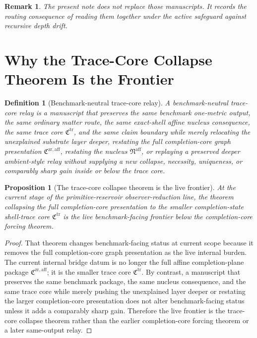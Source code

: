 \documentclass[11pt]{article}
\newcommand{\CompletionCore}{\mathfrak C^{\mathrm{zr,aff}}}
\newcommand{\TraceCore}{\mathfrak C^{\mathrm{tr}}}
\newcommand{\AffineNucleus}{\mathfrak N^{\mathrm{aff}}}
\newtheorem{definition}{Definition}
\newtheorem{proposition}{Proposition}
\newtheorem{remark}{Remark}
\begin{document}
\begin{remark}
The present note does not replace those manuscripts. It records the routing consequence of reading them together under the active safeguard against recursive depth drift.
\end{remark}

\section{Why the Trace-Core Collapse Theorem Is the Frontier}

\begin{definition}[Benchmark-neutral trace-core relay]
A \emph{benchmark-neutral trace-core relay} is a manuscript that preserves the same benchmark one-metric output, the same ordinary matter route, the same exact-shell affine nucleus consequence, the same trace core \(\TraceCore\), and the same claim boundary while merely relocating the unexplained substrate layer deeper, restating the full completion-core graph presentation \(\CompletionCore\), restating the nucleus \(\AffineNucleus\), or replaying a preserved deeper ambient-style relay without supplying a new collapse, necessity, uniqueness, or comparably sharp gain inside or below the trace core.
\end{definition}

\begin{proposition}[The trace-core collapse theorem is the live frontier]
At the current stage of the primitive-reservoir observer-reduction line, the theorem collapsing the full completion-core presentation to the smaller completion-state shell-trace core \(\TraceCore\) is the live benchmark-facing frontier below the completion-core forcing theorem.
\end{proposition}

\begin{proof}
That theorem changes benchmark-facing status at current scope because it removes the full completion-core graph presentation as the live internal burden. The current internal bridge datum is no longer the full affine completion-plane package \(\CompletionCore\); it is the smaller trace core \(\TraceCore\). By contrast, a manuscript that preserves the same benchmark package, the same nucleus consequence, and the same trace core while merely pushing the unexplained layer deeper or restating the larger completion-core presentation does not alter benchmark-facing status unless it adds a comparably sharp gain. Therefore the live frontier is the trace-core collapse theorem rather than the earlier completion-core forcing theorem or a later same-output relay.
\end{proof}
\end{document}
